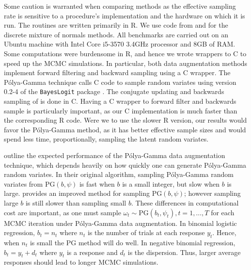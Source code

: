 \documentclass[12pt]{article}
\newcommand{\Polya}{P\'{o}lya}
\newcommand{\PG}{\text{PG}}
\begin{document}
Some caution is warranted when comparing methods as the effective sampling rate
is sensitive to a procedure's implementation and the hardware on which it is
run. The routines are written primarily in R.  We use code from
\cite{binomlogit-2012} and \cite{fruhwirth-schnatter-book-2007} for the discrete
mixture of normals methods.  All benchmarks are carried out on an Ubuntu machine
with Intel Core i5-3570 3.4GHz processor and 8GB of RAM.  Some computations were
burdensome in R, and hence we wrote wrappers to C to speed up the MCMC
simulations.  In particular, both data augmentation methods implement forward
filtering and backward sampling using a C wrapper.  The \Polya-Gamma technique
calls C code to sample random variates using version 0.2-4 of the
\texttt{BayesLogit} package \citep{bayeslogit-2013}.  The conjugate updating and
backwards sampling of \cite{ravines-etal-2006} is done in C.  Having a C wrapper
to forward filter and backwards sample is particularly important, as our C
implementation is much faster than the corresponding R code.  Were we to use the
slower R version, our results would favor the \Polya-Gamma method, as it has
better effective sample sizes and would spend less time, proportionally,
sampling the latent random variates.

\cite{polson-etal-2013} outline the expected performance of the \Polya-Gamma
data augmentation technique, which depends heavily on how quickly one can
generate \Polya-Gamma random variates.  In their original algorithm, sampling
\Polya-Gamma random variates from $\PG(b,\psi)$ is fast when $b$ is a small
integer, but slow when $b$ is large. \cite{windle-thesis-2013} provides an
improved method for sampling $\PG(b,\psi)$; however sampling large $b$ is still
slower than sampling small $b$.  These differences in computational cost are
important, as one must sample $\omega_t \sim \PG(b_t, \psi_t), t=1,\ldots,T$ for
each MCMC iteration under \Polya-Gamma data augmentation.  In binomial logistic
regression, $b_t = n_t$ where $n_t$ is the number of trials at each response
$y_t$.  Hence, when $n_t$ is small the PG method will do well.  In negative
binomial regression, $b_t = y_t + d_t$ where $y_t$ is a response and $d_t$ is
the dispersion.  Thus, larger average responses should lead to longer MCMC
simulations.
\end{document}
